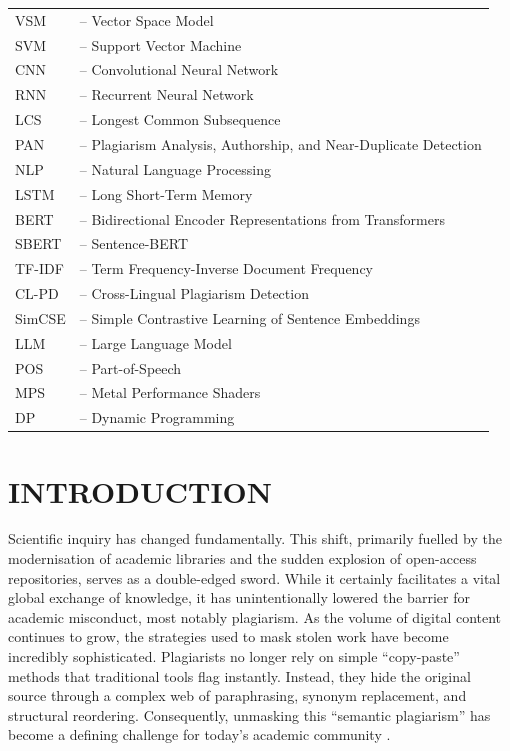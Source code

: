 \documentclass[12pt, a4paper]{article}
\begin{document}
\begin{tabular}{@{}ll@{}}
	VSM    & -- Vector Space Model \\
	SVM    & -- Support Vector Machine \\
	CNN    & -- Convolutional Neural Network \\
	RNN    & -- Recurrent Neural Network \\
	LCS    & -- Longest Common Subsequence \\
	PAN    & -- Plagiarism Analysis, Authorship, and Near-Duplicate Detection \\
	NLP    & -- Natural Language Processing \\
	LSTM   & -- Long Short-Term Memory \\
	BERT   & -- Bidirectional Encoder Representations from Transformers \\
	SBERT  & -- Sentence-BERT \\
	TF-IDF & -- Term Frequency-Inverse Document Frequency \\
	CL-PD  & -- Cross-Lingual Plagiarism Detection \\
	SimCSE & -- Simple Contrastive Learning of Sentence Embeddings \\
	LLM    & -- Large Language Model \\
	POS    & -- Part-of-Speech \\
	MPS    & -- Metal Performance Shaders \\
	DP     & -- Dynamic Programming \\
\end{tabular}

\newpage
\section{INTRODUCTION}

Scientific inquiry has changed fundamentally. This shift, primarily fuelled by the modernisation of academic libraries and the sudden explosion of open-access repositories, serves as a double-edged sword. While it certainly facilitates a vital global exchange of knowledge, it has unintentionally lowered the barrier for academic misconduct, most notably plagiarism. As the volume of digital content continues to grow, the strategies used to mask stolen work have become incredibly sophisticated. Plagiarists no longer rely on simple ``copy-paste'' methods that traditional tools flag instantly. Instead, they hide the original source through a complex web of paraphrasing, synonym replacement, and structural reordering. Consequently, unmasking this ``semantic plagiarism'' has become a defining challenge for today's academic community \citep{Malik2021}.
\end{document}
